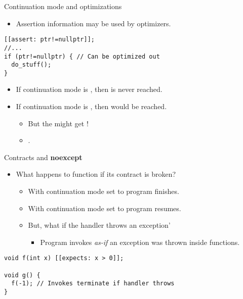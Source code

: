 \begin{frame}[t,fragile]{Continuation mode and optimizations}
\begin{itemize}
  \item Assertion information may be used by optimizers.
\end{itemize}
\begin{lstlisting}
[[assert: ptr!=nullptr]];
//...
if (ptr!=nullptr) { // Can be optimized out
  do_stuff();
}
\end{lstlisting}
\vfill\pause
\begin{itemize}[<+->]
  \item If continuation mode is , then  is never reached.
  \item If continuation mode is , then  would be
reached.
    \begin{itemize}[<+->]
      \item But the  might get !
      \item {}.
    \end{itemize}
\end{itemize}
\end{frame}

\begin{frame}[t,fragile]{Contracts and \textbf{noexcept}}
\begin{itemize}
  \item What happens to  function if its contract is broken?
    \begin{itemize}
      \item With continuation mode set to  program finishes.
      \item With continuation mode set to  program resumes.
      \item But, what if the handler throws an exception'
        \begin{itemize}
          \item Program invokes  \emph{as-if} an exception was thrown inside
functions.
        \end{itemize}
    \end{itemize}
\end{itemize}
\begin{lstlisting}
void f(int x) [[expects: x > 0]];

void g() {
  f(-1); // Invokes terminate if handler throws
}
\end{lstlisting}
\end{frame}
